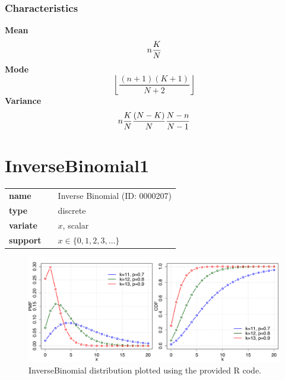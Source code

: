 \subsubsection*{Characteristics}
\smallskip \noindent \hspace{.2cm} \textbf{Mean} 
\begin{equation*}n {K\over N}\end{equation*}
\smallskip \noindent \hspace{.2cm} \textbf{Mode} 
\begin{equation*}\left \lfloor \frac{(n+1)(K+1)}{N+2} \right \rfloor\end{equation*}
\smallskip \noindent \hspace{.2cm} \textbf{Variance} 
\begin{equation*}n{K\over N}{(N-K)\over N}{N-n\over N-1}\end{equation*}
\smallskip
\section*{InverseBinomial1} 

  \bigskip 

\begin{tabular}{p{2cm}cl}
\textbf{name} & & Inverse Binomial (ID: 0000207)\\ 
 
\textbf{type} & & discrete \\ 

\textbf{variate} & & $x$, scalar \\ 

\textbf{support} & & $x \in  \{0,1,2,3,\dots\}$
\end{tabular}

\begin{figure}[ht!]
\centering
  \includegraphics[width=140mm]{pics/InverseBinomial.pdf}
 \caption{InverseBinomial distribution plotted using the provided R code.}
 \label{fig:InverseBinomial}
\end{figure}

